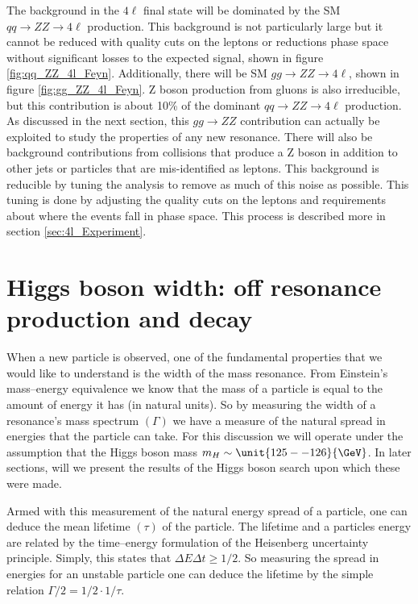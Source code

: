 The background in the $4\ell$ final state will be dominated by the SM $qq \to ZZ \to 4\ell$ production. This background is not particularly large but it cannot be reduced with quality cuts on the leptons or reductions phase space without significant losses to the expected signal, shown in figure \ref{fig:qq_ZZ_4l_Feyn}. Additionally, there will be SM $gg \to ZZ \to 4\ell$, shown in figure \ref{fig:gg_ZZ_4l_Feyn}. Z boson production from gluons is also irreducible, but this contribution is about 10\% of the dominant $qq \to ZZ \to 4\ell$ production. As discussed in the next section, this $gg \to ZZ$ contribution can actually be exploited to study the properties of any new resonance. There will also be background contributions from collisions that produce a Z boson in addition to other jets or particles that are mis-identified as leptons. This background is reducible by tuning the analysis to remove as much of this noise as possible. This tuning is done by adjusting the quality cuts on the leptons and requirements about where the events fall in phase space. This process is described more in section \ref{sec:4l_Experiment}.

\section{Higgs boson width: off resonance production and decay}
\label{sec:Higgs_Width_Pheno}

When a new particle is observed, one of the fundamental properties that we would like to understand is the width of the mass resonance. From Einstein's mass--energy equivalence we know that the mass of a particle is equal to the amount of energy it has (in natural units). So by measuring the width of a resonance's mass spectrum $\left(\Gamma\right)$ we have a measure of the natural spread in energies that the particle can take. For this discussion we will operate under the assumption that the Higgs boson mass $m_{H} \sim \unit{125 -- 126}{\GeV}$. In later sections, will we present the results of the Higgs boson search upon which these were made.

Armed with this measurement of the natural energy spread of a particle, one can deduce the mean lifetime $\left(\tau\right)$ of the particle. The lifetime and a particles energy are related by the time--energy formulation of the Heisenberg uncertainty principle. Simply, this states that $\Delta E \Delta t \geq 1/2$. So measuring the spread in energies for an unstable particle one can deduce the lifetime by the simple relation $\Gamma/2 = 1/2\cdot 1/\tau$. 

